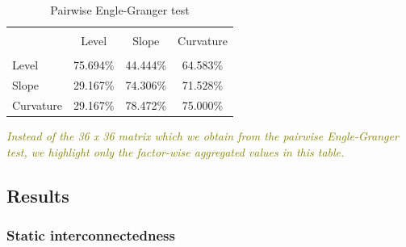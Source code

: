 \documentclass[12pt,bibliography=totoc]{article}
\begin{document}
\begin{table}[H]
\caption{Pairwise Engle-Granger test} %

\centering%
\begin{tabular}{l | ccc}%
\hline\hline \\ [-1.5ex]                         %

	&	Level 	&	Slope	&	Curvature	\\
\hline \\ [-1.5ex]  
Level	&	75.694\%	&	44.444\%	&	64.583\%	\\
Slope	&	29.167\%	&	74.306\%	&	71.528\%	\\
Curvature	&	29.167\%	&	78.472\%	&	75.000\%	\\

\hline            





\end{tabular}
\label{table:nonlin}%
\end{table}

    \begin{tablenotes}
      \small
      \item \textcolor{olive}{\textit{Instead of the 36 x 36 matrix which we obtain from the pairwise Engle-Granger test, we highlight only the factor-wise aggregated values in this table.}}
    \end{tablenotes}


\newpage

\subsection{Results}

\subsubsection{Static interconnectedness}

\end{document}
